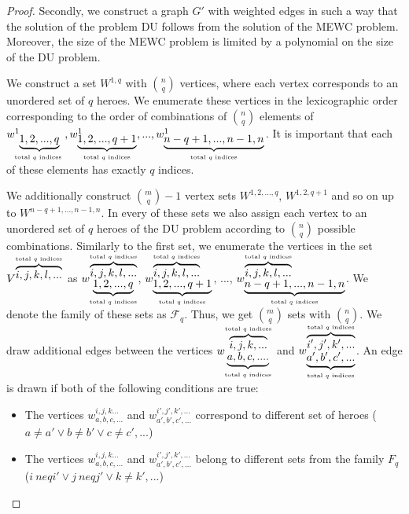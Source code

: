 \documentclass[smallextended]{svjour3}       %
\begin{document}
\begin{proof}
Secondly, we construct a graph $G'$ with weighted edges in such a way that the solution of the problem DU follows from the solution of the MEWC problem. Moreover, the size of the MEWC problem is limited by a polynomial on the size of the DU problem.

    We construct a set $W^{1,q} $ with $\binom{n}{q} $ vertices, where each vertex corresponds to an unordered set of $q$ heroes. We enumerate these vertices in the lexicographic order corresponding to the order of  combinations of $ \binom {n}{q} $ elements of $ w^1_ {\underbrace {1,2, ..., q}_\text{total $ q $ indices }}, w^1_{\underbrace {1,2, ..., q + 1}_\text {total $ q $ indices}}, ..., w^1_ {\underbrace{n-q+1, ..., n-1, n}_\text{total $ q $ indices}} $. It is important that each of these elements has exactly $q$ indices.

We additionally construct $ \binom{m}{q}-1 $ vertex sets $ W^{1,2, ..., q} $, $W^{1,2, q + 1} $ and so on up to $ W^{n-q + 1, ..., n-1, n} $. In every of these sets we also assign each vertex to an unordered set of $q$ heroes of the DU problem according to $\binom{n}{q}$ possible combinations. Similarly to the first set, we enumerate the vertices in the set $V^{\overbrace {i, j, k, l, ...}^\text {total $ q $ indices}} $ as $w_{\underbrace {1,2, ..., q}_\text {total $ q $ indices}}^{\overbrace{i, j, k, l, ...}^\text{total $ q $ indices}} $, $w_{ \underbrace {1,2, ..., q + 1}_\text{total $ q $ indices}}^{\overbrace{i, j, k, l, ...} ^\text{total $ q $ indices}} $,  ..., $w_{\underbrace {n-q + 1, ..., n-1, n}_\text{total $ q $ indices}}^{\overbrace { i, j, k, l, ...}^\text {total $ q $ indices}} $.
    We denote the family of these sets as $ \mathcal {F} _q $. Thus, we get $ \binom{m}{q} $ sets with $ \binom{n}{q} $.
    We draw additional edges between the vertices $w_{\underbrace{a, b, c, ....}_\text{total $ q $ indices}}^{\overbrace{i, j, k , ...}^\text{total $ q $ indices}} $ and $w_{\underbrace{a',b', c', ...}_\text{total $ q $ indices}}^{\overbrace {i ', j', k ', ...}^\text{total $ q $ indices}}$. An edge is drawn if both of the following conditions are true:
    \begin{itemize}
        \item The vertices $w_{a, b, c, ...}^{i, j, k ...} $ and $ w_ {a', b', c', ...}^{i', j', k', ...}$ correspond to different set of heroes ($ a \neq a '\lor b \neq b' \lor c \neq c', ... $)
        \item The vertices $ w_{a, b, c, ...}^ {i, j, k ...} $ and $ w_{a', b', c',...}^{i', j', k', ...} $ belong to different sets from the family $ F_q $ ($ i \ neq i'\lor j \ neq j' \lor k \neq k', ... $)
    \end {itemize}
    

\end{proof}
\end{document}

